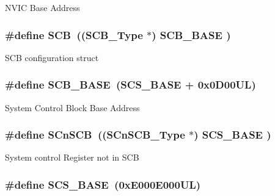 N\-V\-I\-C Base Address \hypertarget{group__CMSIS__core__base_gaaaf6477c2bde2f00f99e3c2fd1060b01}{
\subsubsection[{S\-C\-B}]{\setlength{\rightskip}{0pt plus 5cm}\#define S\-C\-B~(({\bf S\-C\-B\-\_\-\-Type}       $\ast$)     {\bf S\-C\-B\-\_\-\-B\-A\-S\-E}      )}}\label{group__CMSIS__core__base_gaaaf6477c2bde2f00f99e3c2fd1060b01}
S\-C\-B configuration struct \hypertarget{group__CMSIS__core__base_gad55a7ddb8d4b2398b0c1cfec76c0d9fd}{
\subsubsection[{S\-C\-B\-\_\-\-B\-A\-S\-E}]{\setlength{\rightskip}{0pt plus 5cm}\#define S\-C\-B\-\_\-\-B\-A\-S\-E~({\bf S\-C\-S\-\_\-\-B\-A\-S\-E} +  0x0\-D00\-U\-L)}}\label{group__CMSIS__core__base_gad55a7ddb8d4b2398b0c1cfec76c0d9fd}
System Control Block Base Address \hypertarget{group__CMSIS__core__base_ga9fe0cd2eef83a8adad94490d9ecca63f}{
\subsubsection[{S\-Cn\-S\-C\-B}]{\setlength{\rightskip}{0pt plus 5cm}\#define S\-Cn\-S\-C\-B~(({\bf S\-Cn\-S\-C\-B\-\_\-\-Type}    $\ast$)     {\bf S\-C\-S\-\_\-\-B\-A\-S\-E}      )}}\label{group__CMSIS__core__base_ga9fe0cd2eef83a8adad94490d9ecca63f}
System control Register not in S\-C\-B \hypertarget{group__CMSIS__core__base_ga3c14ed93192c8d9143322bbf77ebf770}{
\subsubsection[{S\-C\-S\-\_\-\-B\-A\-S\-E}]{\setlength{\rightskip}{0pt plus 5cm}\#define S\-C\-S\-\_\-\-B\-A\-S\-E~(0x\-E000\-E000\-U\-L)}}\label{group__CMSIS__core__base_ga3c14ed93192c8d9143322bbf77ebf770}
